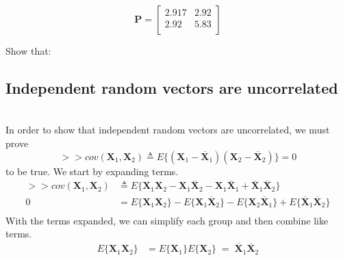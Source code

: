\documentclass[12pt,letterpaper, onecolumn]{exam}
\begin{document}
\begin{questions}
\begin{parts}
\begin{equation}
                        \mathbf{P} = 
                        \begin{bmatrix}
                            2.917 & 2.92 \\
                            2.92 & 5.83 \\
                        \end{bmatrix}
                    \end{equation}
        \end{parts}
\clearpage        
     Show that:
        \begin{parts}
            \part{Independent random vectors are uncorrelated}\\
                \solution
                    In order to show that independent random vectors are uncorrelated, we must prove
                    \[>>cov(\mathbf{X}_1,\mathbf{X}_2)\triangleq E\{(\mathbf{X}_1 - \overline{\mathbf{X}}_1)(\mathbf{X}_2 - \overline{\mathbf{X}}_2)\} = 0\]
                    to be true. We start by expanding terms.
                    \begin{equation}
                        \begin{split}
                            >>cov(\mathbf{X}_1,\mathbf{X}_2) & \triangleq E\{\mathbf{X}_1\mathbf{X}_2 - \mathbf{X}_1\overline{\mathbf{X}}_2 - \mathbf{X}_1\overline{\mathbf{X}}_1 + \overline{\mathbf{X}}_1\overline{\mathbf{X}}_2\}\\
                            0 & = E\{\mathbf{X}_1\mathbf{X}_2\} - E\{\mathbf{X}_1\overline{\mathbf{X}}_2\} - E\{\mathbf{X}_2\overline{\mathbf{X}}_1\} + E\{\overline{\mathbf{X}}_1\overline{\mathbf{X}}_2\}\\               
                        \end{split}
                    \end{equation}
                    With the terms expanded, we can simplify each group and then combine like terms.
                    \begin{equation}
                        \begin{split}
                             E\{\mathbf{X}_1\mathbf{X}_2\} & = E\{\mathbf{X}_1\}E\{\mathbf{X}_2\}\; = \;\overline{\mathbf{X}}_1\overline{\mathbf{X}}_2\\

\end{split}
\end{equation}
\end{parts}
\end{questions}
\end{document}
